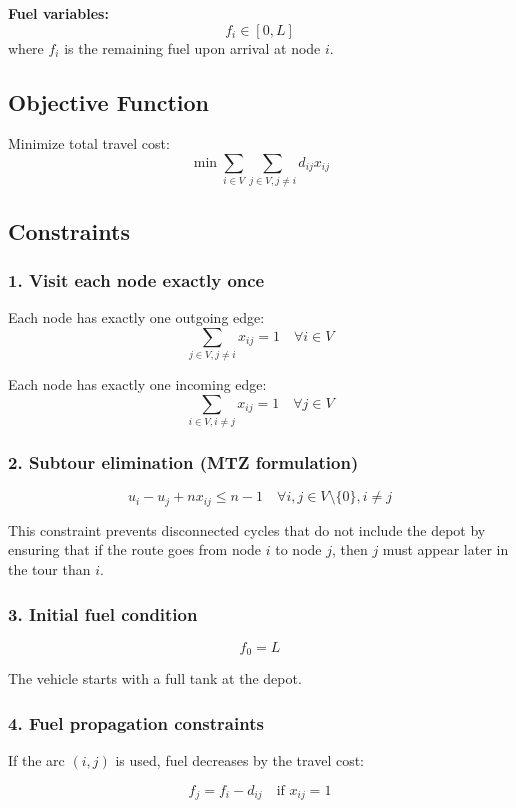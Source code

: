 \documentclass{article}
\begin{document}
\textbf{Fuel variables:}
\[
f_i \in [0, L]
\]
where $f_i$ is the remaining fuel upon arrival at node $i$.

\subsection*{Objective Function}
Minimize total travel cost:
\[
\min \sum_{i \in V} \sum_{j \in V, j \ne i} d_{ij} x_{ij}
\]

\subsection*{Constraints}

\subsubsection*{1. Visit each node exactly once}

Each node has exactly one outgoing edge:
\[
\sum_{j \in V, j \ne i} x_{ij} = 1 \quad \forall i \in V
\]

Each node has exactly one incoming edge:
\[
\sum_{i \in V, i \ne j} x_{ij} = 1 \quad \forall j \in V
\]

\subsubsection*{2. Subtour elimination (MTZ formulation)}

\[
u_i - u_j + n x_{ij} \le n - 1
\quad \forall i,j \in V \setminus \{0\}, i \ne j
\]

This constraint prevents disconnected cycles that do not include the depot by ensuring that if the route goes from node $i$ to node $j$, then $j$ must appear later in the tour than $i$.

\subsubsection*{3. Initial fuel condition}

\[
f_0 = L
\]

The vehicle starts with a full tank at the depot.

\subsubsection*{4. Fuel propagation constraints}

If the arc $(i,j)$ is used, fuel decreases by the travel cost:

\[
f_j = f_i - d_{ij} \quad \text{if } x_{ij} = 1
\]
\end{document}

